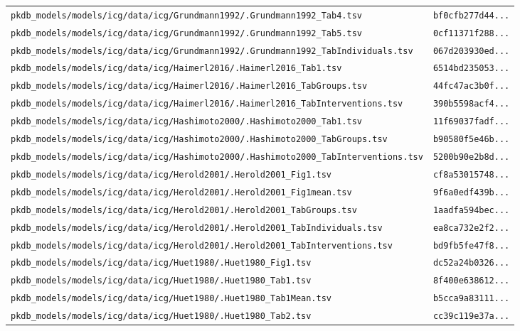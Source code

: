 \begin{longtable}{ll}
\texttt{pkdb\_models/models/icg/data/icg/Grundmann1992/.Grundmann1992\_Tab4.tsv} & \texttt{bf0cfb277d44...} \\
\texttt{pkdb\_models/models/icg/data/icg/Grundmann1992/.Grundmann1992\_Tab5.tsv} & \texttt{0cf11371f288...} \\
\texttt{pkdb\_models/models/icg/data/icg/Grundmann1992/.Grundmann1992\_TabIndividuals.tsv} & \texttt{067d203930ed...} \\
\texttt{pkdb\_models/models/icg/data/icg/Haimerl2016/.Haimerl2016\_Tab1.tsv} & \texttt{6514bd235053...} \\
\texttt{pkdb\_models/models/icg/data/icg/Haimerl2016/.Haimerl2016\_TabGroups.tsv} & \texttt{44fc47ac3b0f...} \\
\texttt{pkdb\_models/models/icg/data/icg/Haimerl2016/.Haimerl2016\_TabInterventions.tsv} & \texttt{390b5598acf4...} \\
\texttt{pkdb\_models/models/icg/data/icg/Hashimoto2000/.Hashimoto2000\_Tab1.tsv} & \texttt{11f69037fadf...} \\
\texttt{pkdb\_models/models/icg/data/icg/Hashimoto2000/.Hashimoto2000\_TabGroups.tsv} & \texttt{b90580f5e46b...} \\
\texttt{pkdb\_models/models/icg/data/icg/Hashimoto2000/.Hashimoto2000\_TabInterventions.tsv} & \texttt{5200b90e2b8d...} \\
\texttt{pkdb\_models/models/icg/data/icg/Herold2001/.Herold2001\_Fig1.tsv} & \texttt{cf8a53015748...} \\
\texttt{pkdb\_models/models/icg/data/icg/Herold2001/.Herold2001\_Fig1mean.tsv} & \texttt{9f6a0edf439b...} \\
\texttt{pkdb\_models/models/icg/data/icg/Herold2001/.Herold2001\_TabGroups.tsv} & \texttt{1aadfa594bec...} \\
\texttt{pkdb\_models/models/icg/data/icg/Herold2001/.Herold2001\_TabIndividuals.tsv} & \texttt{ea8ca732e2f2...} \\
\texttt{pkdb\_models/models/icg/data/icg/Herold2001/.Herold2001\_TabInterventions.tsv} & \texttt{bd9fb5fe47f8...} \\
\texttt{pkdb\_models/models/icg/data/icg/Huet1980/.Huet1980\_Fig1.tsv} & \texttt{dc52a24b0326...} \\
\texttt{pkdb\_models/models/icg/data/icg/Huet1980/.Huet1980\_Tab1.tsv} & \texttt{8f400e638612...} \\
\texttt{pkdb\_models/models/icg/data/icg/Huet1980/.Huet1980\_Tab1Mean.tsv} & \texttt{b5cca9a83111...} \\
\texttt{pkdb\_models/models/icg/data/icg/Huet1980/.Huet1980\_Tab2.tsv} & \texttt{cc39c119e37a...} \\

\end{longtable}
